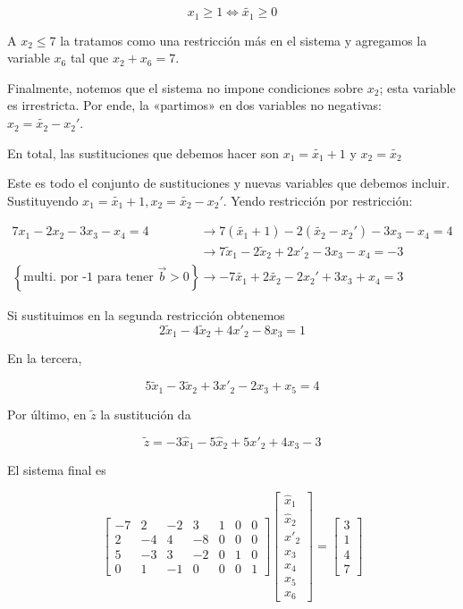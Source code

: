 \documentclass[12pt]{article}
\begin{document}
\begin{equation*}
    x_1 \geq 1 \iff \widetilde{ x_1 } \geq 0
\end{equation*}

A $x_2 \leq 7$ la tratamos como una restricción más en el sistema y agregamos la
variable $x_6$ tal que $x_2 + x_6 = 7$.

Finalmente, notemos que el sistema no impone condiciones sobre $x_2$; esta
variable es irrestricta. Por ende, la «partimos» en dos variables no negativas:
$x_2 = \widetilde{x_2} - x_2'$.

En total, las sustituciones que debemos hacer son $x_1 = \widetilde{ x_1 } + 1 $
y $x_2 = \widetilde{x_2}$

Este es todo el conjunto de sustituciones y nuevas variables que debemos
incluir. Sustituyendo $x_1 = \widetilde{ x_1 } + 1, x_2 = \widetilde{ x_2 } -
x_2'$. Yendo restricción por restricción:

\begin{align*}
    7x_1 - 2x_2 - 3x_3 - x_4 = 4 
    &\to 7(\widetilde{ x_1 } + 1) - 2(\widetilde{ x_2 } - x_2' ) - 3x_3 - x_4 =
    4 \\ 
    &\to 7\widetilde{x}_1 - 2\widetilde{x}_2 + 2x'_2 - 3x_3 - x_4 = -3\\ 
    \left\{ \text{multi. por -1 para tener $\overrightarrow{b} > 0$} \right\}
    &\to -7\widetilde{ x_1 }  + 2\widetilde{ x_2 }  - 2x_2' + 3x_3 + x_4 = 3
\end{align*}

Si sustituimos en la segunda restricción obtenemos $$2\widetilde{x}_1 - 4\widetilde{x}_2 + 4x'_2 - 8x_3 = 1$$

En la tercera, 

$$5\widetilde{x}_1 - 3\widetilde{x}_2 + 3x'_2 - 2x_3 + x_5 = 4$$

Por último, en $\widetilde{ z } $ la sustitución da 

$$\widetilde{z} = -3\hat{x}_1 - 5\hat{x}_2 + 5x'_2 + 4x_3 - 3$$

El sistema final es

$$\begin{bmatrix}
-7 & 2 & -2 & 3 & 1 & 0 & 0 \\
2 & -4 & 4 & -8 & 0 & 0 & 0 \\
5 & -3 & 3 & -2 & 0 & 1 & 0 \\
0 & 1 & -1 & 0 & 0 & 0 & 1
\end{bmatrix}
\begin{bmatrix}
\hat{x}_1 \\
\hat{x}_2 \\
x'_2 \\
x_3 \\
x_4 \\
x_5 \\
x_6
\end{bmatrix}
=
\begin{bmatrix}
3 \\
1 \\
4 \\
7
\end{bmatrix}$$
\end{document}
